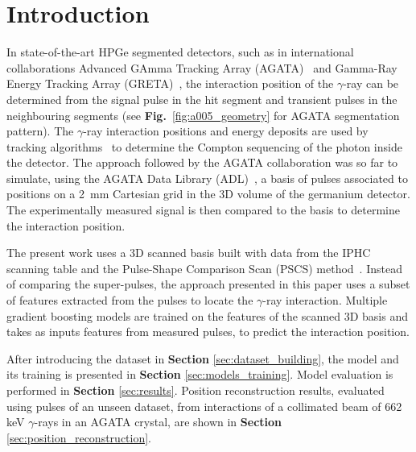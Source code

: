 \section{Introduction}
\label{sec:intro}
In state-of-the-art HPGe segmented detectors, such as in international collaborations Advanced GAmma Tracking Array (AGATA)~\cite{Akkoyun2012} and Gamma-Ray Energy Tracking Array (GRETA)~\cite{Lee2003DevelopmentsArrays}, the interaction position of the $\gamma$-ray can be determined from the signal pulse in the hit segment and transient pulses in the neighbouring segments (see \textbf{Fig.}~\ref{fig:a005_geometry} for AGATA segmentation pattern). The $\gamma$-ray interaction positions and energy deposits are used by tracking algorithms~\cite{Bazzacco:2004nnw,Lopez-Martens2004}  to determine the Compton sequencing of the photon inside the detector. The approach followed by the AGATA collaboration was so far to simulate, using the AGATA Data Library (ADL)~\cite{Bruyneel2016ADL}, a basis of pulses associated to positions on a 2~mm Cartesian grid in the 3D volume of the germanium detector. The experimentally measured signal is then compared to the basis to determine the interaction position.

The present work uses a 3D scanned basis built with data from the IPHC scanning table and the Pulse-Shape Comparison Scan (PSCS) method~\cite{Crespi2008}. Instead of comparing the super-pulses, the approach presented in this paper uses a subset of features extracted from the pulses to locate the $\gamma$-ray interaction. Multiple gradient boosting models are trained on the features of the scanned 3D basis and takes as inputs features from measured pulses, to predict the interaction position.

After introducing the dataset in \textbf{Section} \ref{sec:dataset_building}, the model and its training is presented in \textbf{Section }\ref{sec:models_training}. Model evaluation is performed in \textbf{Section} \ref{sec:results}. Position reconstruction results, evaluated using pulses of an unseen dataset, from interactions of a collimated beam of 662 keV $\gamma$-rays in an AGATA crystal, are shown in \textbf{Section} \ref{sec:position_reconstruction}.

